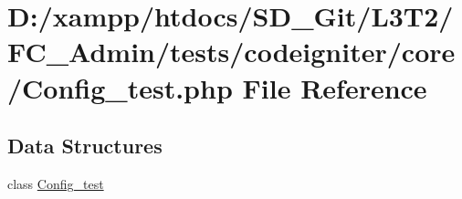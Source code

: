 \hypertarget{_config__test_8php}{}\section{D\+:/xampp/htdocs/\+S\+D\+\_\+\+Git/\+L3\+T2/\+F\+C\+\_\+\+Admin/tests/codeigniter/core/\+Config\+\_\+test.php File Reference}
\label{_config__test_8php}
\subsection*{Data Structures}
\begin{DoxyCompactItemize}
\item 
class \hyperlink{class_config__test}{Config\+\_\+test}
\end{DoxyCompactItemize}
